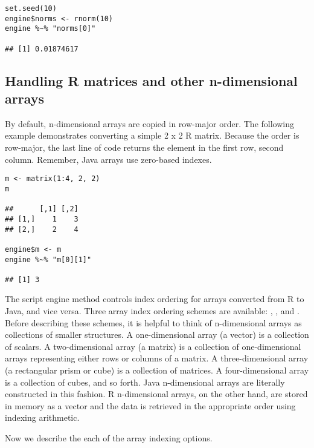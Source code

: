 \begin{verbatim}
set.seed(10)
engine$norms <- rnorm(10)
engine %~% "norms[0]"

## [1] 0.01874617
\end{verbatim}

\subsection{Handling R matrices and other n-dimensional arrays}

By default, n-dimensional arrays are copied in row-major order. The following example demonstrates converting a simple 2 x 2 R matrix. Because the order is row-major, the last line of code returns the element in the first row, second column. Remember, Java arrays use zero-based indexes.

\begin{verbatim}
m <- matrix(1:4, 2, 2)
m

##      [,1] [,2]
## [1,]    1    3
## [2,]    2    4

engine$m <- m
engine %~% "m[0][1]"

## [1] 3
\end{verbatim}

The  script engine method controls index ordering for arrays converted from R to Java, and vice versa. Three array index ordering schemes are available: , , and . Before describing these schemes, it is helpful to think of n-dimensional arrays as collections of smaller structures. A one-dimensional array (a vector) is a collection of scalars. A two-dimensional array (a matrix) is a collection of one-dimensional arrays representing either rows or columns of a matrix. A three-dimensional array (a rectangular prism or cube) is a collection of matrices. A four-dimensional array is a collection of cubes, and so forth. Java n-dimensional arrays are literally constructed in this fashion. R n-dimensional arrays, on the other hand, are stored in memory as a vector and the data is retrieved in the appropriate order using indexing arithmetic.

Now we describe the each of the array indexing options.

